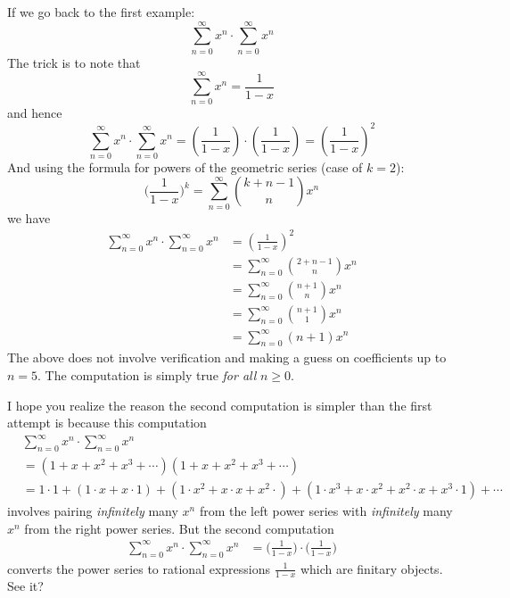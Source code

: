If we go back to the first example:
\[
\sum_{n=0}^\infty x^n \cdot \sum_{n=0}^\infty x^n 
\]
The trick is to note that
\[
\sum_{n=0}^\infty x^n = \frac{1}{1 - x}
\]
and hence
\[
\sum_{n=0}^\infty x^n \cdot \sum_{n=0}^\infty x^n 
=
\left( \frac{1}{1 - x} \right) \cdot
\left( \frac{1}{1 - x} \right)
=
\left( \frac{1}{1 - x} \right)^2
\]
And using the formula for powers of the geometric series (case of $k = 2$):
\[
\biggl( \frac{1}{1 - x} \biggr)^k
= \sum_{n=0}^\infty \binom{k + n - 1}{n} x^n
\]
we have
\begin{align*}
\sum_{n=0}^\infty x^n \cdot \sum_{n=0}^\infty x^n
&= \left( \frac{1}{1 - x} \right)^2 \\
&= \sum_{n=0}^\infty \binom{2 + n - 1}{n} x^n \\
&= \sum_{n=0}^\infty \binom{n + 1}{n} x^n \\
&= \sum_{n=0}^\infty \binom{n + 1}{1} x^n \\
&= \sum_{n=0}^\infty (n+1) x^n
\end{align*}
The above does not involve verification and making a guess on coefficients
up to $n = 5$.
The computation is simply true \textit{for all} $n \geq 0$.

I hope you realize the reason the second computation
is simpler than the first attempt is because this computation
\begin{align*}
&\sum_{n=0}^\infty x^n \cdot \sum_{n=0}^\infty x^n  \\
&= (1 + x + x^2 + x^3 + \cdots ) (1 + x + x^2 + x^3 + \cdots)  \\
&= 
1\cdot 1 + 
(1\cdot x + x\cdot 1) + 
(1 \cdot x^2 + x \cdot x + x^2 \cdot) + 
(1 \cdot x^3 + x \cdot x^2 + x^2 \cdot x + x^3 \cdot 1) + 
\cdots
\end{align*}
involves pairing
\textit{infinitely} many $x^n$ from the left power series
with 
\textit{infinitely} many $x^n$ from the right power series.
But the second computation
\begin{align*}
\sum_{n=0}^\infty x^n \cdot \sum_{n=0}^\infty x^n
&= \biggl( \frac{1}{1 - x} \biggr) \cdot \biggl( \frac{1}{1 - x} \biggr)
\end{align*}
converts the power series to rational expressions
$\displaystyle \frac{1}{1 - x}$ which are finitary objects.
See it?

\newpage
\newpage

